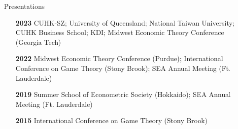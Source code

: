 \begin{rSection}{Presentations}

\begin{itemize}
	\item [\textbf{2023}] CUHK-SZ; University of Queensland; National Taiwan University; CUHK Business School; KDI; Midwest Economic Theory Conference (Georgia Tech)
	\item [\textbf{2022}] Midwest Economic Theory Conference (Purdue); International Conference on Game Theory (Stony Brook); SEA Annual Meeting (Ft. Lauderdale)
	\item [\textbf{2019}] Summer School of Econometric Society (Hokkaido); SEA Annual Meeting (Ft. Lauderdale)
	\item [\textbf{2015}] International Conference on Game Theory (Stony Brook)
\end{itemize}
	

\end{rSection}